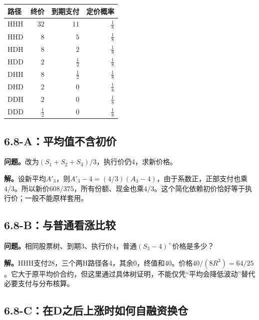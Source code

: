 \documentclass[11pt,a4paper,UTF8,fontset=fandol]{ctexart}
\begin{document}
\begin{longtable}[]{@{}lrrr@{}}
\toprule\noalign{}
路径 & 终价 & 到期支付 & 定价概率 \\
\midrule\noalign{}
\endhead
\bottomrule\noalign{}
\endlastfoot
HHH & \(32\) & \(11\) & \(\frac{1}{8}\) \\
HHD & \(8\) & \(5\) & \(\frac{1}{8}\) \\
HDH & \(8\) & \(2\) & \(\frac{1}{8}\) \\
HDD & \(2\) & \(\frac{1}{2}\) & \(\frac{1}{8}\) \\
DHH & \(8\) & \(\frac{1}{2}\) & \(\frac{1}{8}\) \\
DHD & \(2\) & \(0\) & \(\frac{1}{8}\) \\
DDH & \(2\) & \(0\) & \(\frac{1}{8}\) \\
DDD & \(\frac{1}{2}\) & \(0\) & \(\frac{1}{8}\) \\
\end{longtable}

\endgroup

\subsection{6.8-A：平均值不含初价}\label{aux5e73ux5747ux503cux4e0dux542bux521dux4ef7}

\textbf{问题。}改为\((S_1+S_2+S_3)/3\)，执行价仍4，求新价格。

\textbf{解。}设新平均\(A'_3\)，则\(A'_3-4=(4/3)(A_3-4)\)，由于系数正，正部支付也乘\(4/3\)。所以新价\(\boxed{608/375}\)，所有份额、现金也乘\(4/3\)。这个简化依赖初价恰好等于执行价；一般不能原样套用。

\subsection{6.8-B：与普通看涨比较}\label{bux4e0eux666eux901aux770bux6da8ux6bd4ux8f83}

\textbf{问题。}相同股票树、到期3、执行价4，普通\((S_3-4)^+\)价格是多少？

\textbf{解。}HHH支付28，三个两H路径各4，其余0，终值和40。价格\(40/(8R^3)=\boxed{64/25}\)。它大于原平均价合约，但这里通过具体树证明，不能仅凭``平均会降低波动''替代必要支付与分布核算。

\subsection{6.8-C：在D之后上涨时如何自融资换仓}\label{cux5728dux4e4bux540eux4e0aux6da8ux65f6ux5982ux4f55ux81eaux878dux8d44ux6362ux4ed3}
\end{document}
